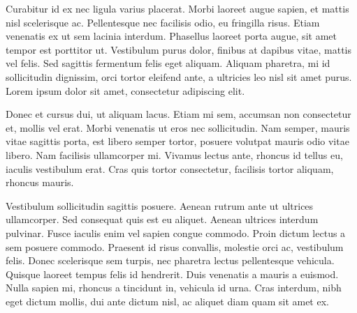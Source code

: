 Curabitur id ex nec ligula varius placerat. Morbi laoreet augue sapien, et mattis nisl scelerisque ac. Pellentesque nec facilisis odio, eu fringilla risus. Etiam venenatis ex ut sem lacinia interdum. Phasellus laoreet porta augue, sit amet tempor est porttitor ut. Vestibulum purus dolor, finibus at dapibus vitae, mattis vel felis. Sed sagittis fermentum felis eget aliquam. Aliquam pharetra, mi id sollicitudin dignissim, orci tortor eleifend ante, a ultricies leo nisl sit amet purus. Lorem ipsum dolor sit amet, consectetur adipiscing elit.

Donec et cursus dui, ut aliquam lacus. Etiam mi sem, accumsan non consectetur et, mollis vel erat. Morbi venenatis ut eros nec sollicitudin. Nam semper, mauris vitae sagittis porta, est libero semper tortor, posuere volutpat mauris odio vitae libero. Nam facilisis ullamcorper mi. Vivamus lectus ante, rhoncus id tellus eu, iaculis vestibulum erat. Cras quis tortor consectetur, facilisis tortor aliquam, rhoncus mauris.

Vestibulum sollicitudin sagittis posuere. Aenean rutrum ante ut ultrices ullamcorper. Sed consequat quis est eu aliquet. Aenean ultrices interdum pulvinar. Fusce iaculis enim vel sapien congue commodo. Proin dictum lectus a sem posuere commodo. Praesent id risus convallis, molestie orci ac, vestibulum felis. Donec scelerisque sem turpis, nec pharetra lectus pellentesque vehicula. Quisque laoreet tempus felis id hendrerit. Duis venenatis a mauris a euismod. Nulla sapien mi, rhoncus a tincidunt in, vehicula id urna. Cras interdum, nibh eget dictum mollis, dui ante dictum nisl, ac aliquet diam quam sit amet ex. 